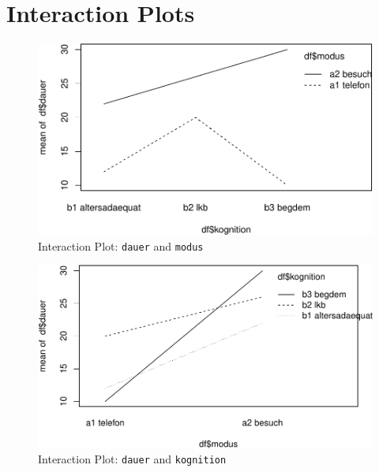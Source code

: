 \documentclass[
  doc,floatsintext]{apa6}
\begin{document}
\clearpage

\hypertarget{interaction-plots}{%
\section{Interaction Plots}\label{interaction-plots}}

\begin{figure}
\centering
\includegraphics{desc_reg_files/figure-latex/iplotdauerkog-1.pdf}
\caption{\label{fig:iplotdauerkog}Interaction Plot: \texttt{dauer} and \texttt{modus}}
\end{figure}

\begin{figure}
\centering
\includegraphics{desc_reg_files/figure-latex/iplotdauermod-1.pdf}
\caption{\label{fig:iplotdauermod}Interaction Plot: \texttt{dauer} and \texttt{kognition}}
\end{figure}
\end{document}
